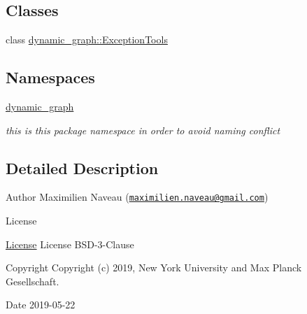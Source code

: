 \subsection*{Classes}
\begin{DoxyCompactItemize}
\item 
class \hyperlink{classdynamic__graph_1_1ExceptionTools}{dynamic\+\_\+graph\+::\+Exception\+Tools}
\end{DoxyCompactItemize}
\subsection*{Namespaces}
\begin{DoxyCompactItemize}
\item 
 \hyperlink{namespacedynamic__graph}{dynamic\+\_\+graph}
\begin{DoxyCompactList}\small\item\em this is this package namespace in order to avoid naming conflict \end{DoxyCompactList}\end{DoxyCompactItemize}


\subsection{Detailed Description}
\begin{DoxyAuthor}{Author}
Maximilien Naveau (\href{mailto:maximilien.naveau@gmail.com}{\tt maximilien.\+naveau@gmail.\+com}) 
\end{DoxyAuthor}
\begin{DoxyRefDesc}{License}
\item[\hyperlink{license__license000012}{License}]License B\+S\+D-\/3-\/\+Clause \end{DoxyRefDesc}
\begin{DoxyCopyright}{Copyright}
Copyright (c) 2019, New York University and Max Planck Gesellschaft. 
\end{DoxyCopyright}
\begin{DoxyDate}{Date}
2019-\/05-\/22 
\end{DoxyDate}
